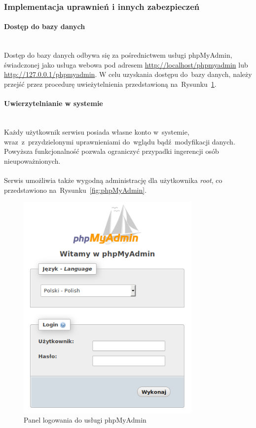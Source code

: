\documentclass[a4paper, 12pt]{article}
\begin{document}
\subsubsection{Implementacja uprawnień i innych zabezpieczeń}
\paragraph{Dostęp do bazy danych} \mbox{}\\
Dostęp do bazy danych odbywa się za pośrednictwem usługi phpMyAdmin, świadczonej jako usługa webowa pod adresem \url{http://localhost/phpmyadmin} lub \url{http://127.0.0.1/phpmyadmin}. W celu uzyskania dostępu do~bazy danych, należy przejść przez procedurę uwieżytelnienia przedstawioną na~Rysunku~\ref{fig:logowanieDophpMyAdmin}.
\paragraph{Uwierzytelnianie w systemie} \mbox{}\\
Każdy użytkownik serwisu posiada własne konto w~systemie, wraz~z~przydzielonymi uprawnieniami do~wglądu bądź~modyfikacji danych.
Powyższa funkcjonalność pozwala ograniczyć przypadki ingerencji osób nieupoważnionych.\\\\
Serwis umożliwia także wygodną administrację dla użytkownika \textit{root}, co przedstawiono na~Rysunku~\ref{fig:phpMyAdmin}.

\begin{figure}[H]
	\centering
	\includegraphics[width=9cm]{phpMyAdmin_login.png}
	\caption[Panel logowania do phpMyAdmin]{Panel logowania do usługi phpMyAdmin}
	\label{fig:logowanieDophpMyAdmin}
\end{figure}
\end{document}
